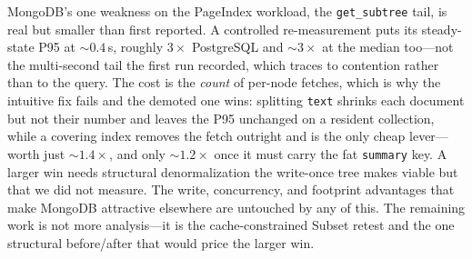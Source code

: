 \documentclass[11pt]{article}
\newcommand{\code}[1]{\texttt{#1}}
\begin{document}
MongoDB's one weakness on the PageIndex workload, the \code{get\_subtree} tail, is
real but smaller than first reported. A controlled re-measurement puts its
steady-state P95 at ${\sim}0.4$\,s, roughly $3\times$ PostgreSQL and ${\sim}3\times$
at the median too---not the multi-second tail the first run recorded, which traces
to contention rather than to the query. The cost is the \emph{count} of per-node
fetches, which is why the intuitive fix fails and the demoted one wins: splitting
\code{text} shrinks each document but not their number and leaves the P95
unchanged on a resident collection, while a covering index removes the fetch
outright and is the only cheap lever---worth just ${\sim}1.4\times$, and only
${\sim}1.2\times$ once it must carry the fat \code{summary} key. A larger win needs
structural denormalization the write-once tree makes viable but that we did not
measure. The write, concurrency, and footprint advantages that make MongoDB
attractive elsewhere are untouched by any of this. The remaining work is not more
analysis---it is the cache-constrained Subset retest and the one structural
before/after that would price the larger win.
\end{document}
